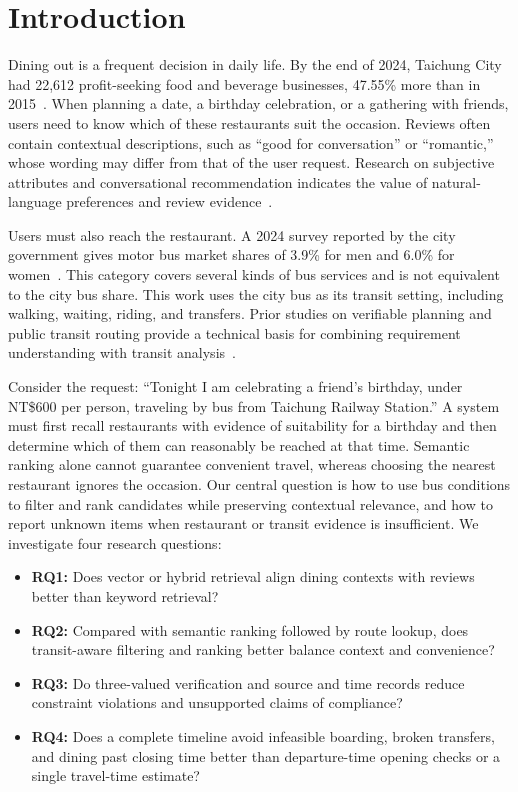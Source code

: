 \documentclass[conference]{IEEEtran}
\begin{document}
\section{Introduction}\label{sec:intro}
Dining out is a frequent decision in daily life. By the end of 2024, Taichung City had 22,612 profit-seeking food and beverage businesses, 47.55\% more than in 2015~\cite{taichung_eat_outside}. When planning a date, a birthday celebration, or a gathering with friends, users need to know which of these restaurants suit the occasion. Reviews often contain contextual descriptions, such as ``good for conversation'' or ``romantic,'' whose wording may differ from that of the user request. Research on subjective attributes and conversational recommendation indicates the value of natural-language preferences and review evidence~\cite{subjective_attributes,critique_preference}.

Users must also reach the restaurant. A 2024 survey reported by the city government gives motor bus market shares of 3.9\% for men and 6.0\% for women~\cite{taichung_gender}. This category covers several kinds of bus services and is not equivalent to the city bus share. This work uses the city bus as its transit setting, including walking, waiting, riding, and transfers. Prior studies on verifiable planning and public transit routing provide a technical basis for combining requirement understanding with transit analysis~\cite{llm_planning_tools,bus_dynamic_replanning}.

Consider the request: ``Tonight I am celebrating a friend's birthday, under NT\$600 per person, traveling by bus from Taichung Railway Station.'' A system must first recall restaurants with evidence of suitability for a birthday and then determine which of them can reasonably be reached at that time. Semantic ranking alone cannot guarantee convenient travel, whereas choosing the nearest restaurant ignores the occasion. Our central question is how to use bus conditions to filter and rank candidates while preserving contextual relevance, and how to report unknown items when restaurant or transit evidence is insufficient. We investigate four research questions:
\begin{itemize}
\item \textbf{RQ1:} Does vector or hybrid retrieval align dining contexts with reviews better than keyword retrieval?
\item \textbf{RQ2:} Compared with semantic ranking followed by route lookup, does transit-aware filtering and ranking better balance context and convenience?
\item \textbf{RQ3:} Do three-valued verification and source and time records reduce constraint violations and unsupported claims of compliance?
\item \textbf{RQ4:} Does a complete timeline avoid infeasible boarding, broken transfers, and dining past closing time better than departure-time opening checks or a single travel-time estimate?
\end{itemize}
\end{document}
